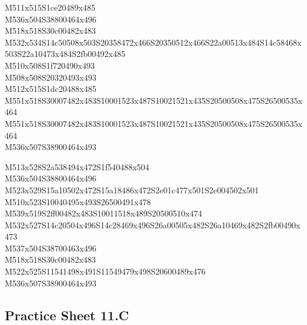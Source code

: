 \documentclass{article}
\begin{document}
\begin{multicols}{5}
\begin{center}
M511x515S1ce20489x485 %
\\M536x504S38800464x496 %
\\M518x518S30c00482x483 %
\\M532x534S14c50508x503S20358472x466S20350512x466S22a00513x484S14c58468x503S22a10473x484S2fb00492x485 %
\\M510x508S1f720490x493 %
\\M508x508S20320493x493 %
\\M512x515S1dc20488x485 %
\\M551x518S30007482x483S10001523x487S10021521x435S20500508x475S26500535x464 %
\\M551x518S30007482x483S10001523x487S10021521x435S20500508x475S26500535x464 %
\\M536x507S38900464x493 %
\vfil
\columnbreak

M513x528S2a538494x472S1f540488x504 %
\\M536x504S38800464x496 %
\\M523x529S15a10502x472S15a18486x472S2e01c477x501S2e004502x501 %
\\M510x523S10040495x493S26500491x478 %
\\M539x519S2ff00482x483S10011518x489S20500510x474 %
\\M532x527S14c20504x496S14c28469x496S26a00505x482S26a10469x482S2fb00490x473 %
\\M537x504S38700463x496 %
\\M518x518S30c00482x483 %
\\M522x525S11541498x491S11549479x498S20600489x476 %
\\M536x507S38900464x493 %
\vfil

\end{center}
\end{multicols}

\subsection{Practice Sheet 11.C}
\end{document}
